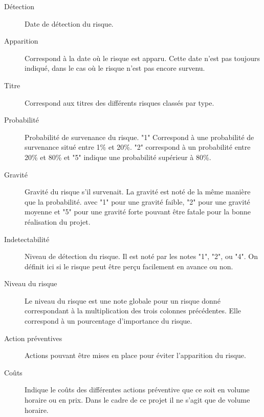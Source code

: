 \documentclass[etudiants]{support-iutrs}
\begin{document}
\begin{description}

\item[Détection]
Date de détection du risque.

\item[Apparition]
Correspond à la date où le risque est apparu. Cette date n'est pas toujours indiqué, dans le cas où le risque n'est pas encore survenu.

\item[Titre]
Correspond aux titres des différents risques classés par type.

\item[Probabilité]
Probabilité de survenance du risque. "1" Correspond à une probabilité de survenance situé entre 1\% et 20\%. "2" correspond à un probabilité entre 20\% et 80\% et "5" indique une probabilité supérieur à 80\%.

\item[Gravité]
Gravité du risque s'il survenait. La gravité est noté de la même manière que la probabilité. avec "1" pour une gravité faible, "2" pour une gravité moyenne et "5" pour une gravité forte pouvant être fatale pour la bonne réalisation du projet.

\item[Indetectabilité]
Niveau de détection du risque. Il est noté par les notes "1", "2", ou "4". On définit ici si le risque peut être perçu facilement en avance ou non.

\item[Niveau du risque]
Le niveau du risque est une note globale pour un risque donné correspondant à la multiplication des trois colonnes précédentes. Elle correspond à un pourcentage d'importance du risque.

\item[Action préventives]
Actions pouvant être mises en place pour éviter l'apparition du risque.

\item[Coûts]
Indique le coûts des différentes actions préventive que ce soit en volume horaire ou en prix. Dans le cadre de ce projet il ne s'agit que de volume horaire.  
\end{description}
\end{document}

